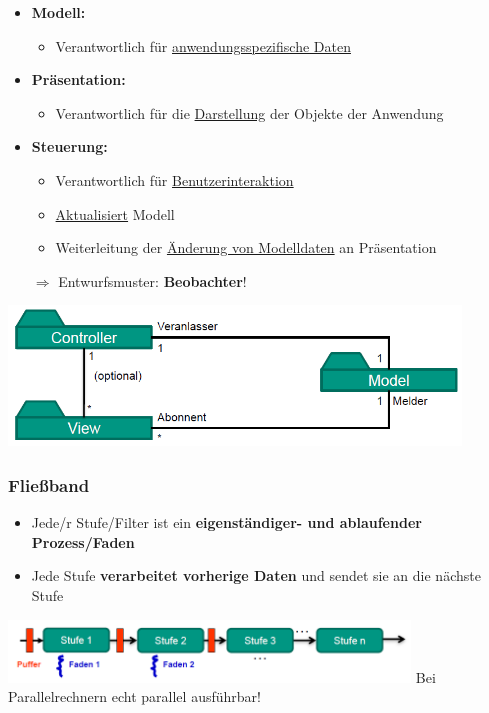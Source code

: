 			\begin{itemize}
				\item \textbf{Modell:}
				\begin{itemize}
					\item Verantwortlich für \underline{anwendungsspezifische Daten}
				\end{itemize}
				\item \textbf{Präsentation:}
				\begin{itemize}
					\item Verantwortlich für die \underline{Darstellung} der Objekte der Anwendung
				\end{itemize}
				\item \textbf{Steuerung:}
				\begin{itemize}
					\item Verantwortlich für \underline{Benutzerinteraktion}
					\item \underline{Aktualisiert} Modell
					\item Weiterleitung der \underline{Änderung von Modelldaten} an Präsentation
				\end{itemize}
				$\Rightarrow$ Entwurfsmuster: \textbf{Beobachter}!
			\end{itemize}	
			\begin{center}
				\includegraphics[width=0.9\textwidth]{../resources/images/mvc.png}
			\end{center}
			
		\subsubsection{Fließband}
					
			\begin{itemize}
				\item Jede/r Stufe/Filter ist ein \textbf{eigenständiger- und ablaufender Prozess/Faden}
				\item Jede Stufe \textbf{verarbeitet vorherige Daten} und sendet sie an die nächste Stufe
			\end{itemize}
				
			\begin{center}
				\includegraphics[width=0.8\textwidth]{../resources/images/fliessband.png}
				Bei Parallelrechnern echt parallel ausführbar!
			\end{center}
				
